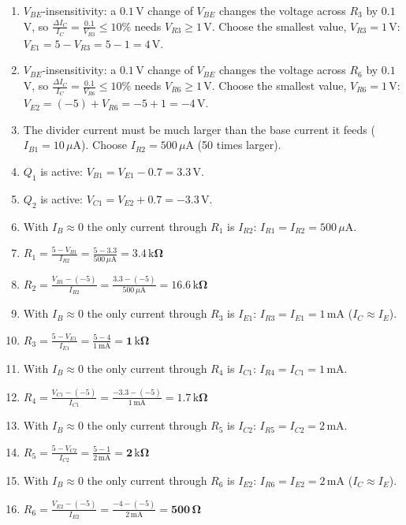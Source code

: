 \documentclass[11pt]{article}
\newcommand{\solstep}[2]{\par\medskip{\color{stepc}\textbf{Step #1 --- #2}}\par\nopagebreak}
\begin{document}
\solstep{2}{Design, node by node}\begin{enumerate}[leftmargin=*,itemsep=3pt]
\item $V_{BE}$-insensitivity: a $0.1$\,V change of $V_{BE}$ changes the voltage across $R_{3}$ by $0.1$\,V, so $\frac{\Delta I_C}{I_C} = \frac{0.1}{V_{R3}} \le 10\%$ needs $V_{R3} \ge 1$\,V. Choose the smallest value, $V_{R3} = 1$\,V: $V_{E1} = 5 - V_{R3} = 5 - 1 = 4\,\mathrm{V}$.
\item $V_{BE}$-insensitivity: a $0.1$\,V change of $V_{BE}$ changes the voltage across $R_{6}$ by $0.1$\,V, so $\frac{\Delta I_C}{I_C} = \frac{0.1}{V_{R6}} \le 10\%$ needs $V_{R6} \ge 1$\,V. Choose the smallest value, $V_{R6} = 1$\,V: $V_{E2} = (-5) + V_{R6} = -5 + 1 = -4\,\mathrm{V}$.
\item The divider current must be much larger than the base current it feeds ($I_{B1} = 10\,\mu \mathrm{A}$). Choose $I_{R2} = 500\,\mu \mathrm{A}$ (50 times larger).
\item $Q_{1}$ is active: $V_{B1} = V_{E1} - 0.7 = 3.3\,\mathrm{V}$.
\item $Q_{2}$ is active: $V_{C1} = V_{E2} + 0.7 = -3.3\,\mathrm{V}$.
\item With $I_B\approx0$ the only current through $R_{1}$ is $I_{R2}$: $I_{R1} = I_{R2} = 500\,\mu \mathrm{A}$.
\item $\displaystyle R_{1} = \frac{5 - V_{B1}}{I_{R2}} = \frac{5 - 3.3}{500\,\mu \mathrm{A}} = \mathbf{3.4\,\mathrm{k}\Omega}$
\item $\displaystyle R_{2} = \frac{V_{B1} - (-5)}{I_{R2}} = \frac{3.3 - (-5)}{500\,\mu \mathrm{A}} = \mathbf{16.6\,\mathrm{k}\Omega}$
\item With $I_B\approx0$ the only current through $R_{3}$ is $I_{E1}$: $I_{R3} = I_{E1} = 1\,\mathrm{m}\mathrm{A}$ ($I_C\approx I_E$).
\item $\displaystyle R_{3} = \frac{5 - V_{E1}}{I_{E1}} = \frac{5 - 4}{1\,\mathrm{m}\mathrm{A}} = \mathbf{1\,\mathrm{k}\Omega}$
\item With $I_B\approx0$ the only current through $R_{4}$ is $I_{C1}$: $I_{R4} = I_{C1} = 1\,\mathrm{m}\mathrm{A}$.
\item $\displaystyle R_{4} = \frac{V_{C1} - (-5)}{I_{C1}} = \frac{-3.3 - (-5)}{1\,\mathrm{m}\mathrm{A}} = \mathbf{1.7\,\mathrm{k}\Omega}$
\item With $I_B\approx0$ the only current through $R_{5}$ is $I_{C2}$: $I_{R5} = I_{C2} = 2\,\mathrm{m}\mathrm{A}$.
\item $\displaystyle R_{5} = \frac{5 - V_{C2}}{I_{C2}} = \frac{5 - 1}{2\,\mathrm{m}\mathrm{A}} = \mathbf{2\,\mathrm{k}\Omega}$
\item With $I_B\approx0$ the only current through $R_{6}$ is $I_{E2}$: $I_{R6} = I_{E2} = 2\,\mathrm{m}\mathrm{A}$ ($I_C\approx I_E$).
\item $\displaystyle R_{6} = \frac{V_{E2} - (-5)}{I_{E2}} = \frac{-4 - (-5)}{2\,\mathrm{m}\mathrm{A}} = \mathbf{500\,\Omega}$
\end{enumerate}
\end{document}

